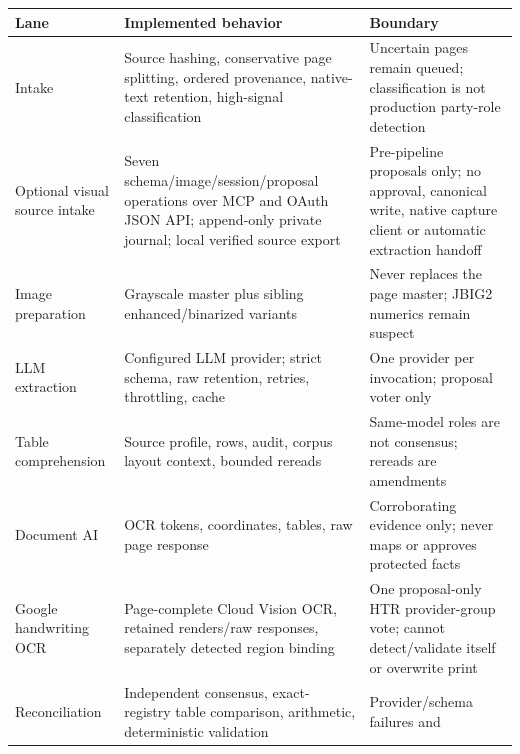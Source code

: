 \documentclass[
]{article}
\newcounter{none} %
\begin{document}
{\def\LTcaptype{none} %
\begin{longtable}[]{@{}
  >{\raggedright\arraybackslash}p{}
  >{\raggedright\arraybackslash}p{}
  >{\raggedright\arraybackslash}p{}@{}}
\toprule\noalign{}
\begin{minipage}[b]{\linewidth}\raggedright
Lane
\end{minipage} & \begin{minipage}[b]{\linewidth}\raggedright
Implemented behavior
\end{minipage} & \begin{minipage}[b]{\linewidth}\raggedright
Boundary
\end{minipage} \\
\midrule\noalign{}
\endhead
\bottomrule\noalign{}
\endlastfoot
Intake & Source hashing, conservative page splitting, ordered
provenance, native-text retention, high-signal classification &
Uncertain pages remain queued; classification is not production
party-role detection \\
Optional visual source intake & Seven schema/image/session/proposal
operations over MCP and OAuth JSON API; append-only private journal;
local verified source export & Pre-pipeline proposals only; no approval,
canonical write, native capture client or automatic extraction
handoff \\
Image preparation & Grayscale master plus sibling enhanced/binarized
variants & Never replaces the page master; JBIG2 numerics remain
suspect \\
LLM extraction & Configured LLM provider; strict schema, raw retention,
retries, throttling, cache & One provider per invocation; proposal voter
only \\
Table comprehension & Source profile, rows, audit, corpus layout
context, bounded rereads & Same-model roles are not consensus; rereads
are amendments \\
Document AI & OCR tokens, coordinates, tables, raw page response &
Corroborating evidence only; never maps or approves protected facts \\
Google handwriting OCR & Page-complete Cloud Vision OCR, retained
renders/raw responses, separately detected region binding & One
proposal-only HTR provider-group vote; cannot detect/validate itself or
overwrite print \\
Reconciliation & Independent consensus, exact-registry table comparison,
arithmetic, deterministic validation & Provider/schema failures and

\end{longtable}}
\end{document}
